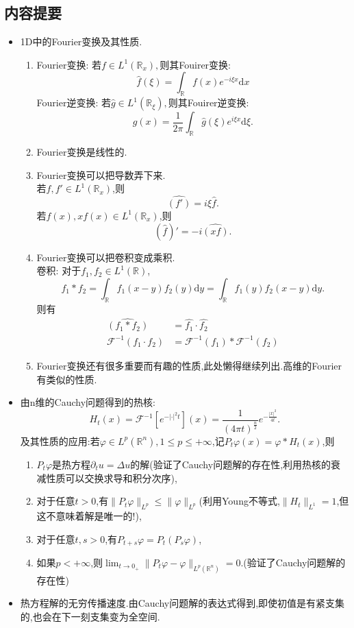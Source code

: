 \documentclass[12pt, a4paper]{ctexbook}
\newcommand{\dx}{\text{d}x}
\newcommand{\dy}{\text{d}y}
\renewcommand{\d}{\text{d}}
\newcommand{\cosy}{\xi}%
\begin{document}
    \subsection{内容提要}
    \begin{itemize}
        \item 1D中的Fourier变换及其性质.\\
        \begin{enumerate}
            \item Fourier变换: 若$f\in L^1(\mathbb{R}_x),$则其Fouirer变换:
            $$\widehat{f}(\cosy) = \int_\mathbb{R} f(x)e^{-i\cosy x}\dx$$
            Fourier逆变换: 若$\hat{g}\in L^1(\mathbb{R}_\cosy),$则其Fouirer逆变换:
            $$g(x) = \frac1{2\pi}\int_\mathbb R \widehat g(\cosy)e^{i\cosy x}\d\cosy.$$
            \item Fourier变换是线性的.
            \item Fourier变换可以把导数弄下来.\\
            若$f, f'\in L^1(\mathbb R_x)$,则
            $$\widehat{(f')} = i\cosy \widehat f.$$
            若$f(x), xf(x)\in L^1(\mathbb R_x)$,则
            $$\left( \widehat f\right)'  = -i \widehat{(xf)}.$$
            \item Fourier变换可以把卷积变成乘积.\\
            卷积: 对于$f_1, f_2\in L^1(\mathbb R)$,
            $$f_1 * f_2 = \int_\mathbb{R} f_1(x-y)f_2(y)\dy = \int_\mathbb{R}f_1(y)f_2(x-y)\dy.$$
            则有
            \begin{align*}
            \widehat{(f_1 * f_2)} &= \widehat{f_1} \cdot \widehat{f_2}\\
            \mathcal{F}^{-1}(f_1\cdot f_2) &= \mathcal{F}^{-1}(f_1) * \mathcal{F}^{-1}(f_2)
            \end{align*}
            \item Fourier变换还有很多重要而有趣的性质,此处懒得继续列出.高维的Fourier有类似的性质.
        \end{enumerate}
        \item 由n维的Cauchy问题得到的热核:
        $$H_t(x) = \mathcal{F}^{-1}[e^{-|\cdot|^2t}](x) = \frac1{(4\pi t)^{\frac n2}}e^{-\frac{|x|^2}{4t}}.$$
        及其性质的应用:若$\varphi\in L^p(\mathbb R^n), 1\leq p\leq+\infty$,记$P_t\varphi(x)= \varphi * H_t(x)$,则
        \begin{enumerate}
            \item $P_t\varphi$是热方程$\partial_t u = \Delta u$的解(验证了Cauchy问题解的存在性,利用热核的衰减性质可以交换求导和积分次序),
            \item 对于任意$t>0$,有$\|P_t\varphi\|_{L^p} \leq \|\varphi\|_{L^p}$(利用Young不等式,$\|H_t\|_{L^1} = 1$,但这不意味着解是唯一的!),
            \item 对于任意$t,s>0$,有$P_{t+s}\varphi = P_t(P_s\varphi)$,
            \item 如果$p<+\infty$,则$\lim_{t\rightarrow 0_+} \|P_t\varphi -\varphi\|_{L^p(\mathbb{R}^n)} = 0$.(验证了Cauchy问题解的存在性)
        \end{enumerate}
        \item 热方程解的无穷传播速度.由Cauchy问题解的表达式得到,即使初值是有紧支集的,也会在下一刻支集变为全空间.
    \end{itemize}
    
\end{document}

